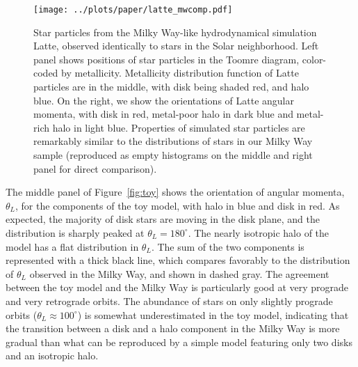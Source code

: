 \documentclass[apj, twocolappendix, numberedappendix, appendixfloats]{emulateapj}
\begin{document}
\begin{figure}
\begin{center}
\texttt{[image: ../plots/paper/latte\_mwcomp.pdf]}
\caption{Star particles from the Milky Way-like hydrodynamical simulation Latte, observed identically to stars in the Solar neighborhood.
Left panel shows positions of star particles in the Toomre diagram, color-coded by metallicity.
Metallicity distribution function of Latte particles are in the middle, with disk being shaded red, and halo blue.
On the right, we show the orientations of Latte angular momenta, with disk in red, metal-poor halo in dark blue and metal-rich halo in light blue.
Properties of simulated star particles are remarkably similar to the distributions of stars in our Milky Way sample (reproduced as empty histograms on the middle and right panel for direct comparison).}
\label{fig:latte}
\end{center}
\end{figure}

The middle panel of Figure~\ref{fig:toy} shows the orientation of angular momenta, $\theta_L$, for the components of the toy model, with halo in blue and disk in red.
As expected, the majority of disk stars are moving in the disk plane, and the distribution is sharply peaked at $\theta_L=180^\circ$.
The nearly isotropic halo of the \citet{bensby2003} model has a flat distribution in $\theta_L$.
The sum of the two components is represented with a thick black line, which compares favorably to the distribution of $\theta_L$ observed in the Milky Way, and shown in dashed gray.
The agreement between the toy model and the Milky Way is particularly good at very prograde and very retrograde orbits.
The abundance of stars on only slightly prograde orbits ($\theta_L\approx100^\circ$) is somewhat underestimated in the toy model, indicating that the transition between a disk and a halo component in the Milky Way is more gradual than what can be reproduced by a simple model featuring only two disks and an isotropic halo. %
\end{document}
